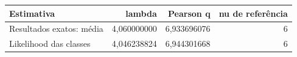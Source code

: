 \begin{tabular}{lrrr}
\toprule
Estimativa & lambda & Pearson q & nu de referência \\
\midrule
Resultados exatos: média & 4,060000000 & 6,933696076 & 6 \\
Likelihood das classes & 4,046238824 & 6,944301668 & 6 \\
\bottomrule
\end{tabular}
